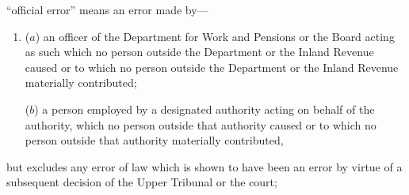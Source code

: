 \documentclass[12pt,a4paper]{article}
\begin{document}
\begin{enumerate}
    “official error” means an error made by—
\begin{enumerate}\item[]
    ($a$) 
    an officer of the Department for Work and Pensions
 or the Board acting as such which no person outside the Department
 or the Inland Revenue caused or to which no person outside the Department
 or the Inland Revenue materially contributed;
 
   ($b$) 
    a person employed by a designated authority acting on behalf of the authority, which no person outside that authority caused or to which no person outside that authority materially contributed,
\end{enumerate}
    but excludes any error of law which is shown to have been an error by virtue of a subsequent decision of 
the Upper Tribunal  %
or the court;


%



\end{enumerate}
\end{document}
